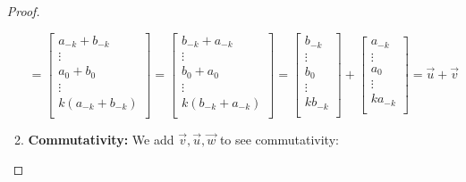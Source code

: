 \documentclass[11pt]{article}
\newcommand{\vect}[1]{\begin{bmatrix}#1\end{bmatrix}}
\begin{document}
\begin{enumerate}[label=\arabic*.]
\begin{proof}
\begin{enumerate}
$$        = \vect{a_{-k}+b_{-k} \\ \vdots \\a_0+b_0 \\ \vdots \\ k(a_{-k}+ b_{-k}) \\} 
        = \vect{b_{-k}+a_{-k} \\ \vdots \\b_0+a_0 \\ \vdots \\ k(b_{-k} + a_{-k}) \\} 
        = \vect{b_{-k} \\ \vdots \\b_0 \\ \vdots \\ k b_{-k} \\} + \vect{a_{-k} \\ \vdots \\a_0 \\ \vdots \\ k a_{-k} \\} 
        = \vec{u} + \vec{v}
        $$
        
        \item \textbf{Commutativity:} We add $\vec{v}, \vec{u}, \vec{w}$ to see commutativity:
        

\end{enumerate}
\end{proof}
\end{enumerate}
\end{document}
